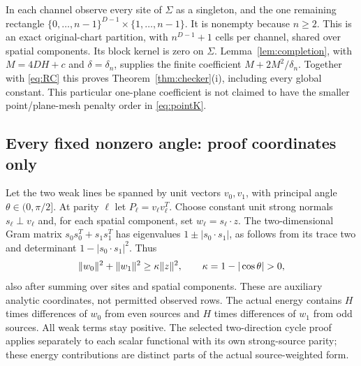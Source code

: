 In each channel observe every site of $\Sigma$ as a singleton, and the one
remaining rectangle
$\{0,\ldots,n-1\}^{D-1}\times\{1,\ldots,n-1\}$.
It is nonempty because $n\geq2$. This is an exact original-chart partition,
with $n^{D-1}+1$ cells per channel, shared over spatial components. Its block
kernel is zero on $\Sigma$. Lemma~\ref{lem:completion}, with
$M=4DH+c$ and $\delta=\delta_n$, supplies the finite coefficient
$M+2M^2/\delta_n$. Together with \eqref{eq:RC} this proves
Theorem~\ref{thm:checker}(i), including every global constant. This particular
one-plane coefficient is not claimed to have the smaller point/plane-mesh
penalty order in \eqref{eq:pointK}.

\subsection{Every fixed nonzero angle: proof coordinates only}
Let the two weak lines be spanned by unit vectors $v_0,v_1$, with principal
angle $\theta\in(0,\pi/2]$. At parity $\ell$ let $P_\ell=v_\ell v_\ell^T$.
Choose constant unit strong normals $s_\ell\perp v_\ell$ and, for each spatial
component, set $w_\ell=s_\ell\cdot z$. The two-dimensional Gram matrix
$s_0s_0^T+s_1s_1^T$ has eigenvalues $1\pm|s_0\cdot s_1|$, as follows from
its trace two and determinant $1-|s_0\cdot s_1|^2$. Thus
\begin{equation}\label{eq:anglegram}
 \norm{w_0}^2+\norm{w_1}^2\geq\kappa\norm z^2,
 \qquad\kappa=1-|\cos\theta|>0,
\end{equation}
also after summing over sites and spatial components.
These are auxiliary analytic coordinates, not permitted observed rows.
The actual energy contains $H$ times differences of $w_0$ from even sources
and $H$ times differences of $w_1$ from odd sources. All weak terms stay
positive. The selected two-direction cycle proof applies separately to each
scalar functional with its own strong-source parity; these energy contributions
are distinct parts of the actual source-weighted form.

